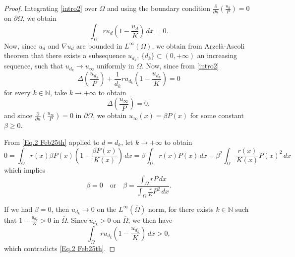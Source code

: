 \documentclass[11pt]{article}
\newcommand{\N}{\mathbb{N}}
\newcommand{\parentheses}[1]{\left(#1\right)}
\theoremstyle{definition}
\theoremstyle{remark}
\begin{document}
\begin{proof}
    
    Integrating \eqref{intro2} over $\Omega$ and using the boundary condition $\frac{\partial}{\partial n}(\frac{u_d}{P})=0$ on $\partial\Omega$, we obtain
    \begin{equation}\label{Eq.2 Feb25th}
        \int_\Omega ru_d\parentheses{1-\frac{u_d}{K}}\,dx=0.
    \end{equation}
    Now, since $u_d$ and $\nabla u_d$ are bounded in $L^\infty(\Omega)$, we obtain from Arzelà-Ascoli theorem that there exists a subsequence $u_{d_k}$, $\{d_k\}\subset(0,+\infty)$ an increasing sequence, such that $u_{d_k}\to u_\infty$ uniformly in $\Omega$. Now, since from \eqref{intro2} 
    \begin{equation*}
        \Delta\parentheses{\frac{u_{d_k}}{P}}+\frac{1}{d_k}ru_{d_k}\parentheses{1-\frac{u_{d_k}}{K}}=0
    \end{equation*}
    for every $k\in\N$, take $k\to+\infty$ to obtain
    \begin{equation*}
        \Delta \parentheses{\frac{u_\infty}{P}}=0,
    \end{equation*}
    and since $\frac{\partial}{\partial n} (\frac{u_\infty}{P})=0$ in $\partial\Omega$, we obtain $u_\infty(x)=\beta P(x)$ for some constant $\beta \geq 0$.

    From \eqref{Eq.2 Feb25th} applied to $d=d_k$, let $k\to+\infty$ to obtain 
    \begin{equation*}
        0=\int_{\Omega}r(x)\beta P(x)\parentheses{1-\frac{\beta P(x)}{K(x)}}\,dx=\beta \int_\Omega r(x)P(x)\,dx-\beta ^2\int_\Omega\frac{r(x)}{K(x)}P(x)^2\,dx
    \end{equation*}
    which implies
    \begin{equation*}
        \beta=0\,\,\,\,\textrm{ or }\,\,\,\, \beta =\frac{\int_\Omega rP\,dx}{\int_\Omega\frac{r}{K}P^2\,dx}.
    \end{equation*}

    If we had $\beta =0$, then $u_{d_k}\to0$ on the $L^\infty(\overline{\Omega})$ norm, for there exists $k\in\N$ such that $1-\frac{u_{d_k}}{K}>0$ in $\overline{\Omega}$. Since $u_{d_k}>0$ on $\overline{\Omega}$, we then have
    \begin{equation*}
        \int_\Omega ru_{d_k}\parentheses{1-\frac{u_{d_k}}{K}}\,dx>0,
    \end{equation*}
    which contradicts \eqref{Eq.2 Feb25th}.
    
\end{proof}
\end{document}
